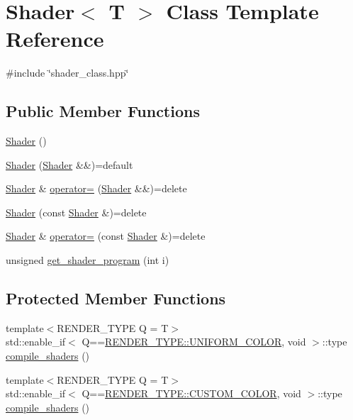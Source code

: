 \hypertarget{classShader}{}\section{Shader$<$ T $>$ Class Template Reference}
\label{classShader}


{\ttfamily \#include \char`\"{}shader\+\_\+class.\+hpp\char`\"{}}

\subsection*{Public Member Functions}
\begin{DoxyCompactItemize}
\item 
\mbox{\hyperlink{classShader_a02faa1d7140779d7a24e06d1aff58d68}{Shader}} ()
\item 
\mbox{\hyperlink{classShader_ab3e3c7604cc25077b6b41353535b54de}{Shader}} (\mbox{\hyperlink{classShader}{Shader}} \&\&)=default
\item 
\mbox{\hyperlink{classShader}{Shader}} \& \mbox{\hyperlink{classShader_a3b92fece66095389581a2bf6b3124657}{operator=}} (\mbox{\hyperlink{classShader}{Shader}} \&\&)=delete
\item 
\mbox{\hyperlink{classShader_a49b2a448a00b5e1413c17501f8873cca}{Shader}} (const \mbox{\hyperlink{classShader}{Shader}} \&)=delete
\item 
\mbox{\hyperlink{classShader}{Shader}} \& \mbox{\hyperlink{classShader_a58f724fecccecdb1633e08ce0258da37}{operator=}} (const \mbox{\hyperlink{classShader}{Shader}} \&)=delete
\item 
unsigned \mbox{\hyperlink{classShader_a2c19b216850480109f9d5f7ed6ab6aa6}{get\+\_\+shader\+\_\+program}} (int i)
\end{DoxyCompactItemize}
\subsection*{Protected Member Functions}
\begin{DoxyCompactItemize}
\item 
{\footnotesize template$<$R\+E\+N\+D\+E\+R\+\_\+\+T\+Y\+PE Q = T$>$ }\\std\+::enable\+\_\+if$<$ Q==\mbox{\hyperlink{render_8hpp_a24e288e18eb7b6e01de7565001fedb60aa98862073f71a928bad5099cc3e1c2ed}{R\+E\+N\+D\+E\+R\+\_\+\+T\+Y\+P\+E\+::\+U\+N\+I\+F\+O\+R\+M\+\_\+\+C\+O\+L\+OR}}, void $>$\+::type \mbox{\hyperlink{classShader_a1f4179a8be4ce0b82cf7b3079fe2bee3}{compile\+\_\+shaders}} ()
\item 
{\footnotesize template$<$R\+E\+N\+D\+E\+R\+\_\+\+T\+Y\+PE Q = T$>$ }\\std\+::enable\+\_\+if$<$ Q==\mbox{\hyperlink{render_8hpp_a24e288e18eb7b6e01de7565001fedb60a9d34355b5a26c54b5dbab1e45245a6f4}{R\+E\+N\+D\+E\+R\+\_\+\+T\+Y\+P\+E\+::\+C\+U\+S\+T\+O\+M\+\_\+\+C\+O\+L\+OR}}, void $>$\+::type \mbox{\hyperlink{classShader_a52de08866cf90ca949ece30eece06312}{compile\+\_\+shaders}} ()
\end{DoxyCompactItemize}
